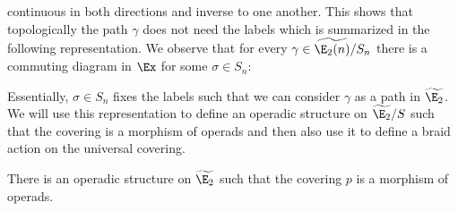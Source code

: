 continuous in both directions and inverse to one another. This shows that topologically the path $\gamma$
does not need the labels which is summarized in the following representation.
We observe that for every $\gamma \in \widetilde{\E_2(n)} \slash S_n$ there is a commuting diagram in 
$\Ex$ for some $\sigma \in S_n$:
\begin{center}
\end{center} 

Essentially, $\sigma \in S_n$ fixes the labels such that we can consider $\gamma$ as a path in $\widetilde{\E_2}$.
We will use this representation to define an operadic structure on 
$\widetilde{\E_2} \slash S$ such that the covering is a morphism of operads and then also use it to define a 
braid action on the universal covering.
\begin{prop}
    There is an operadic structure on $\widetilde{\E_2}$ such that the covering $p$ is a morphism 
    of operads.
\end{prop}

